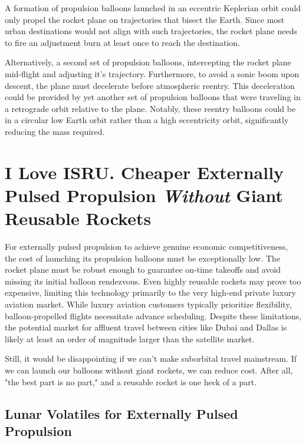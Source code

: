 \documentclass{article}
\begin{document}
{A formation of propulsion balloons launched in an eccentric Keplerian orbit could only propel the  rocket plane on trajectories that bisect the Earth. Since most urban destinations would not align with such trajectories, the rocket plane needs to fire an adjustment burn at least once to reach the destination.

Alternatively, a second set of propulsion balloons, intercepting the rocket plane mid-flight and adjusting it's trajectory. Furthermore, to avoid a sonic boom upon descent, the plane must decelerate before atmospheric reentry. This deceleration could be provided by yet another set of propulsion balloons that were traveling in a retrograde orbit relative to the plane. Notably, these reentry balloons could be in a circular low Earth orbit rather than a high eccentricity orbit, significantly reducing the mass required.

\section{I Love ISRU.  Cheaper Externally Pulsed Propulsion \textit{Without} Giant Reusable Rockets}
For externally pulsed propulsion to achieve genuine economic competitiveness, the cost of launching its propulsion balloons must be exceptionally low.  The rocket plane must be robust enough to guarantee on-time takeoffs and avoid missing its initial balloon rendezvous. Even highly reusable rockets may prove too expensive, limiting this technology primarily to the very high-end private luxury aviation market. While luxury aviation customers typically prioritize flexibility, balloon-propelled flights necessitate advance scheduling.  Despite these limitations, the potential market for affluent travel between cities like Dubai and Dallas is likely at least an order of magnitude larger than the satellite market.

Still, it would be disappointing if we can't make suborbital travel mainstream.   If we can launch our balloons without giant rockets, we can reduce cost.   After all, "the best part is no part," \cite{best_part_no_part} and a reusable rocket is one heck of a part.

\subsection{Lunar Volatiles for Externally Pulsed Propulsion}

}
\end{document}
